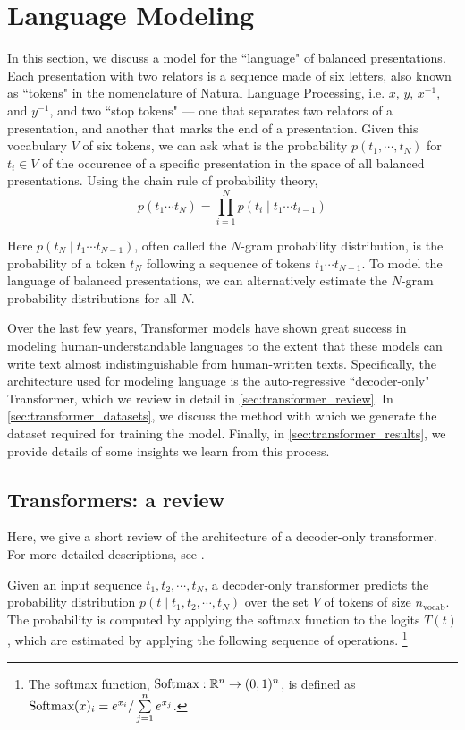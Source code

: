 
\section{Language Modeling}

In this section, we discuss a model for the ``language" of balanced presentations. Each presentation with two relators is a sequence made of six letters, also known as ``tokens" in the nomenclature of Natural Language Processing, i.e. $x$, $y$, $x^{-1}$, and $y^{-1}$, and two ``stop tokens" --- one that separates two relators of a presentation, and another that marks the end of a presentation. Given this vocabulary $V$ of six tokens, we can ask what is the probability $p(t_1, \cdots, t_N)$ for $t_i \in V$ of the occurence of a specific presentation in the space of all balanced presentations. Using the chain rule of probability theory, 
\[
p(t_1 \cdots t_{N}) = \prod\limits_{i=1}^{N} p (t_{i} \mid t_{1} \cdots t_{i-1}) 
\]

Here $p (t_{N} \mid t_{1} \cdots t_{N-1})$, often called the $N$-gram probability distribution, is the probability of a token $t_N$ following a sequence of tokens $t_{1} \cdots t_{N-1}$. To model the language of balanced presentations, we can alternatively estimate the $N$-gram probability distributions for all $N$. 

Over the last few years, Transformer models have shown great success in modeling human-understandable languages to the extent that these models can write text almost indistinguishable from human-written texts. Specifically, the architecture used for modeling language is the auto-regressive ``decoder-only" Transformer, which we review in detail in \autoref{sec:transformer_review}. In \autoref{sec:transformer_datasets}, we discuss the method with which we generate the dataset required for training the model. Finally, in \autoref{sec:transformer_results}, we provide details of some insights we learn from this process. 

\subsection{Transformers: a review\label{sec:transformer_review}}

Here, we give a short review of the architecture of a decoder-only transformer. For more detailed descriptions, see \cite{vaswani2023attention, elhage2021mathematical, douglas2023large}. 

Given an input sequence $t_1, t_2, \cdots, t_{N}$, a decoder-only transformer predicts the probability distribution $p(t \mid t_1, t_2, \cdots, t_{N})$ over the set $V$ of tokens of size $n_{\text{vocab}}$. The probability is computed by applying the softmax function to the logits $T(t)$, which are estimated by applying the following sequence of operations.
\footnote{The softmax function, $\text{Softmax}: \mathbb{R}^n \to (0, 1)^{n}$, is defined as $\text{Softmax}(x)_i = e^{x_i} / \sum\limits_{j=1}^n e^{x_j}$.}

